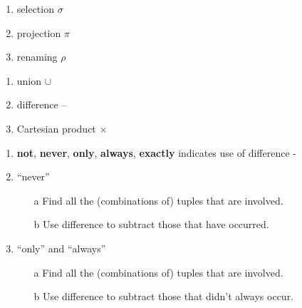 \begin{minipage}{0.5\linewidth}
\begin{enumerate}
\item selection $\sigma$
\item projection $\pi$
\item renaming $\rho$
\end{enumerate}
\end{minipage}
\begin{minipage}{0.5\linewidth}
\begin{enumerate}[resume,start=3]
\item union $\cup$
\item difference –
\item Cartesian product $\times$
\end{enumerate}
\end{minipage}
\begin{minipage}{\linewidth}
\begin{enumerate}
\item \textbf{not}, \textbf{never}, \textbf{only}, \textbf{always}, \textbf{exactly} indicates use of difference -
\item ``never''
  \begin{enumerate}[leftmargin=2pt]
  \item[a] Find all the (combinations of) tuples that are involved.
  \item[b] Use difference to subtract those that have occurred.
  \end{enumerate}
\item ``only'' and ``always''
  \begin{enumerate}[leftmargin=2pt]
  \item[a] Find all the (combinations of) tuples that are involved.
  \item[b] Use difference to subtract those that didn’t always occur.
  \end{enumerate}
\end{enumerate}
\end{minipage}
